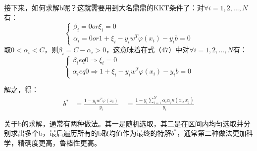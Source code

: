 接下来，如何求解b呢？这就需要用到大名鼎鼎的KKT条件了：对$\forall i=1,2,...,N$有：
\begin{equation}\begin{cases}\beta_i=0 or\xi_i=0\\\alpha_i=0or1+\xi_i-y_iw^T\varphi(x_i)-y_ib=0\end{cases}\end{equation}
取$0<\alpha_{i}<C$，则$\beta_i=C-\alpha_i>0$，这意味着在式（47）中对$\forall i=1,2,...,N$有：
\begin{equation}\begin{cases}
		\beta_i 
		eq 0 \Rightarrow \xi_i = 0 \\
		\alpha_i 
		eq 0 \Rightarrow 1 + \xi_i - y_i w^T \varphi(x_i) - y_i b = 0
\end{cases}\end{equation}

解之，得：
\begin{equation}
	\begin{aligned}
		b^* &= \frac{1-y_iw^T\varphi(x_i)}{y_i} \
		&= \frac{1-y_i\sum_{i=1}^N\alpha_i\alpha_j\kappa(x_i,x_j)}{y_i}
	\end{aligned}
\end{equation}

关于b的求解，通常有两种做法。其一是随机选取，其二是在区间内均匀选取并分别求出多个b，最后遍历所有的b取均值作为最终的特解$b^{*}$，通常第二种做法更加科学，精确度更高，鲁棒性更高。